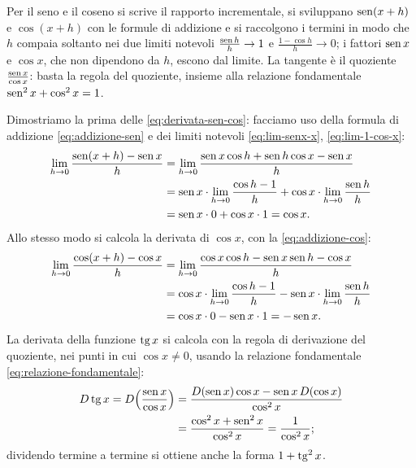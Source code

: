 \begin{schema}
\end{schema}

\begin{strategia}
Per il seno e il coseno si scrive il rapporto incrementale, si sviluppano $\operatorname{sen}(x+h)$ e
$\cos(x+h)$ con le formule di addizione e si raccolgono i termini in modo che $h$ compaia
soltanto nei due limiti notevoli $\frac{\operatorname{sen} h}{h}\to1$ e $\frac{1-\cos h}{h}\to0$; i
fattori $\operatorname{sen} x$ e $\cos x$, che non dipendono da $h$, escono dal limite. La tangente è il
quoziente $\frac{\operatorname{sen} x}{\cos x}$: basta la regola del quoziente, insieme alla relazione
fondamentale $\operatorname{sen}^{2}x+\cos^{2}x=1$.
\end{strategia}

\begin{dimostrazione}
Dimostriamo la prima delle \eqref{eq:derivata-sen-cos}: facciamo uso della formula di
addizione \eqref{eq:addizione-sen} e dei limiti notevoli \eqref{eq:lim-senx-x},
\eqref{eq:lim-1-cos-x}:
\begin{equation}\label{eq:derivata-sen}
\begin{split}
  \lim_{h\to0}\frac{\operatorname{sen}(x+h)-\operatorname{sen} x}{h}
  &=\lim_{h\to0}\frac{\operatorname{sen} x\cos h+\operatorname{sen} h\cos x-\operatorname{sen} x}{h}\\
  &=\operatorname{sen} x\cdot\lim_{h\to0}\frac{\cos h-1}{h}+\cos x\cdot\lim_{h\to0}\frac{\operatorname{sen} h}{h}\\
  &=\operatorname{sen} x\cdot0+\cos x\cdot1=\cos x .
\end{split}
\end{equation}
Allo stesso modo si calcola la derivata di $\cos x$, con la \eqref{eq:addizione-cos}:
\begin{equation}\label{eq:derivata-cos}
\begin{split}
  \lim_{h\to0}\frac{\cos(x+h)-\cos x}{h}
  &=\lim_{h\to0}\frac{\cos x\cos h-\operatorname{sen} x\operatorname{sen} h-\cos x}{h}\\
  &=\cos x\cdot\lim_{h\to0}\frac{\cos h-1}{h}-\operatorname{sen} x\cdot\lim_{h\to0}\frac{\operatorname{sen} h}{h}\\
  &=\cos x\cdot0-\operatorname{sen} x\cdot1=-\operatorname{sen} x .
\end{split}
\end{equation}
La derivata della funzione $\operatorname{tg} x$ si calcola con la regola di derivazione del quoziente,
nei punti in cui $\cos x\neq0$, usando la relazione fondamentale
\eqref{eq:relazione-fondamentale}:
\begin{equation}\label{eq:derivata-tg-calcolo}
\begin{split}
  D\operatorname{tg} x=D\Bigl(\frac{\operatorname{sen} x}{\cos x}\Bigr)&=\frac{D(\operatorname{sen} x)\cos x-\operatorname{sen} x\,D(\cos x)}{\cos^{2}x}\\
  &=\frac{\cos^{2}x+\operatorname{sen}^{2}x}{\cos^{2}x}=\frac1{\cos^{2}x};
\end{split}
\end{equation}
dividendo termine a termine si ottiene anche la forma $1+\operatorname{tg}^{2}x$.
\end{dimostrazione}

